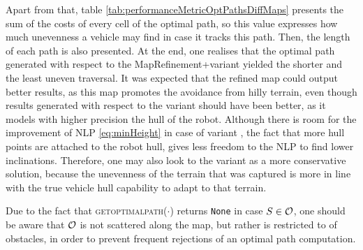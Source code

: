 Apart from that, table \ref{tab:performanceMetricOptPathsDiffMaps} presents the sum of the costs of every cell of the optimal path, so this value expresses how much unevenness a vehicle may find in case it tracks this path. Then, the length of each path is also presented. At the end, one realises that the optimal path generated with respect to the MapRefinement+\shpwgap variant yielded the shorter and the least uneven traversal. It was expected that the refined map could output better results, as this map promotes the avoidance from hilly terrain, even though results generated with respect to the \mhpwgap variant should have been better, as it models with higher precision the hull of the robot. Although there is room for the improvement of NLP \ref{eq:minHeight} in case of variant \mhpw, the fact that more hull points are attached to the robot hull, gives less freedom to the NLP to find lower inclinations. Therefore, one may also look to the \mhpwgap variant as a more conservative solution, because the unevenness of the terrain that was captured is more in line with the true vehicle hull capability to adapt to that terrain.

\begin{remark}
Due to the fact that \textsc{getoptimalpath($\cdot$)} returns \texttt{None} in case $S \in \mathcal{O}$, one should be aware that $\mathcal{O}$ is not scattered along the map, but rather is restricted to  of obstacles, in order to prevent frequent rejections of an optimal path computation.
\end{remark}
